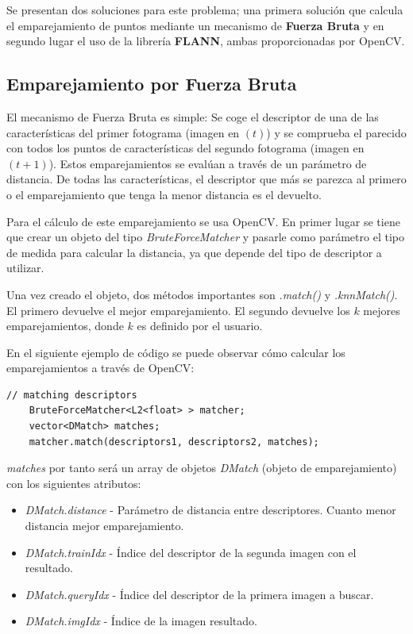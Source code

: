 Se presentan dos soluciones para este problema; una primera solución que calcula el emparejamiento de puntos mediante un mecanismo de \textbf{Fuerza Bruta} y en segundo lugar el uso de la librería \textbf{FLANN}, ambas proporcionadas por OpenCV.

\subsection{Emparejamiento por Fuerza Bruta}

El mecanismo de Fuerza Bruta es simple: Se coge el descriptor de una de las características del primer fotograma (imagen en $(t)$) y se comprueba el parecido con todos los puntos de características del segundo fotograma (imagen en $(t+1)$). Estos emparejamientos se evalúan a través de un parámetro de distancia. De todas las características, el descriptor que más se parezca al primero o el emparejamiento que tenga la menor distancia es el devuelto.

Para el cálculo de este emparejamiento se usa OpenCV. En primer lugar se tiene que crear un objeto del tipo \textit{BruteForceMatcher} y pasarle como parámetro el tipo de medida para calcular la distancia, ya que depende del tipo de descriptor a utilizar.

Una vez creado el objeto, dos métodos importantes son \textit{.match()} y \textit{.knnMatch()}. El primero devuelve el mejor emparejamiento. El segundo devuelve los $k$ mejores emparejamientos, donde $k$ es definido por el usuario.


En el siguiente ejemplo de código se puede observar cómo calcular los emparejamientos a través de OpenCV:

\begin{lstlisting}[style=CStyle]
	// matching descriptors
	BruteForceMatcher<L2<float> > matcher;
	vector<DMatch> matches;
	matcher.match(descriptors1, descriptors2, matches);
\end{lstlisting}

\textit{matches} por tanto será un array de objetos \textit{DMatch} (objeto de emparejamiento) con los siguientes atributos:

\begin{itemize}
\item \textit{DMatch.distance} - Parámetro de distancia entre descriptores. Cuanto menor distancia mejor emparejamiento.

\item \textit{DMatch.trainIdx} - Índice del descriptor de la segunda imagen con el resultado.

\item \textit{DMatch.queryIdx} - Índice del descriptor de la primera imagen a buscar.

\item \textit{DMatch.imgIdx} - Índice de la imagen resultado.
\end{itemize}

